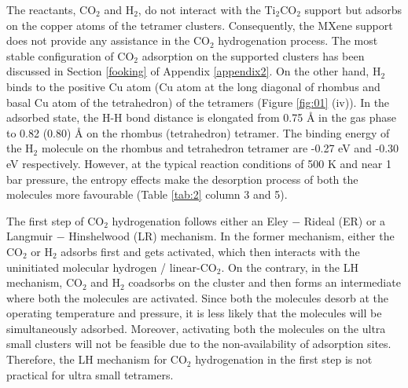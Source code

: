 The reactants, CO$_2$ and H$_2$, do not interact with the Ti$_2$CO$_2$ support but adsorbs on the copper atoms of the tetramer clusters. Consequently, the MXene support does not provide any assistance in the CO$_2$ hydrogenation process. The most stable configuration of CO$_2$ adsorption on the supported clusters has been discussed in Section \ref{fooking} of Appendix \ref{appendix2}. On the other hand, H$_2$ binds to the positive Cu atom (Cu atom at the long diagonal of rhombus and basal Cu atom of the tetrahedron) of the tetramers (Figure \ref{fig:01} (iv)). In the adsorbed state, the H-H bond distance is elongated from 0.75 {\AA} in the gas phase to 0.82 (0.80) {\AA} on the rhombus (tetrahedron) tetramer. The binding energy of the H$_2$ molecule on the rhombus and tetrahedron tetramer are -0.27 eV and -0.30 eV respectively. However, at the typical reaction conditions of 500 K and near 1 bar pressure, the entropy effects make the desorption process of both the molecules more favourable (Table \ref{tab:2} column 3 and 5).

The first step of CO$_2$ hydrogenation follows either an Eley $-$ Rideal (ER) or a Langmuir $-$ Hinshelwood (LR) mechanism. In the former mechanism, either the CO$_2$ or H$_2$ adsorbs first and gets activated, which then interacts with the uninitiated molecular hydrogen / linear-CO$_2$. On the contrary, in the LH mechanism, CO$_2$ and H$_2$ coadsorbs on the cluster and then forms an intermediate where both the molecules are activated. Since both the molecules desorb at the operating temperature and pressure, it is less likely that the molecules will be simultaneously adsorbed. Moreover, activating both the molecules on the ultra small clusters will not be feasible due to the non-availability of adsorption sites. Therefore, the LH mechanism for CO$_2$ hydrogenation in the first step is not practical for ultra small tetramers. 

